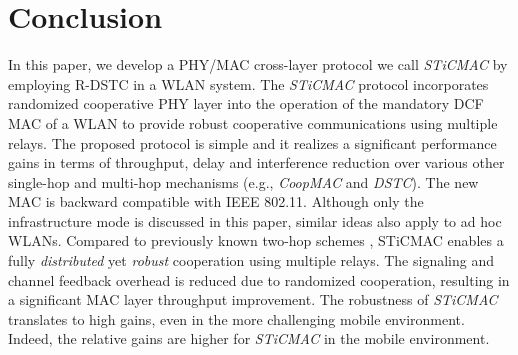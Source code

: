 \documentclass[peerreview,draftcls,onecolumn,12pt,a4paper]{IEEEtran}
\begin{document}
\vspace{-0.2in}
\section{Conclusion}
\label{Conclusion}

In this paper, we develop a PHY/MAC cross-layer protocol we call
\emph{STiCMAC} by employing R-DSTC in a WLAN system. The
\emph{STiCMAC} protocol incorporates randomized cooperative PHY
layer into the operation of the mandatory DCF MAC of a WLAN to
provide robust cooperative communications using multiple relays. The proposed protocol
is simple and it realizes a significant performance gains in terms of throughput,
delay and interference reduction over various other single-hop and
multi-hop mechanisms (e.g., \emph{CoopMAC} and \emph{DSTC}).
The new MAC is backward compatible with IEEE 802.11. Although only the infrastructure mode is discussed in this paper,
similar ideas also apply to ad hoc WLANs. Compared to previously
known two-hop schemes \cite{coopmacliu, Jakllari06}, STiCMAC
enables a fully \emph{distributed} yet \emph{robust} cooperation
using multiple relays. The signaling and channel feedback overhead
is reduced due to randomized cooperation, resulting in a
significant MAC layer throughput improvement. The robustness of
\emph{STiCMAC} translates to high gains, even in the more
challenging mobile environment. Indeed, the relative gains are
higher for \emph{STiCMAC} in the mobile environment.
\end{document}
